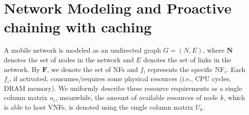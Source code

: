 \documentclass[journal]{IEEEtran}
\begin{document}
%



\section{Network Modeling and Proactive chaining with caching}

A mobile network is modeled as an undirected  graph $G=(N,E)$, where $\mathbf{N}$ denotes the set of nodes in the network and $E$ denotes the set of links in the network. By $\mathbf{F}$, we denote the set of NFs and $f_{i}$ represents the specific NF$_{i}$. Each $f_{i}$, if activated, consumes/requires some physical resources (i.e., CPU cycles, DRAM memory). We uniformly describe these resource requirements as a single column matrix $u_{i}$, meanwhile, the amount of available resources of node $k$, which is able to host VNFs, is denoted using the single column matrix $U_{k}$.
\end{document}
